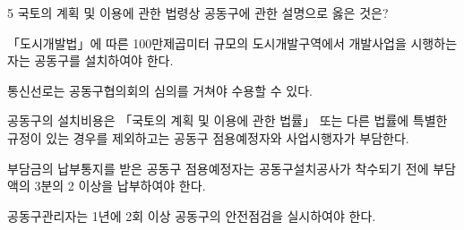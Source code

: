\begin{question}{5}
국토의 계획 및 이용에 관한 법령상 공동구에 관한 설명으로 옳은 것은?
\begin{choices}
  \item 「도시개발법」에 따른 100만제곱미터 규모의 도시개발구역에서 개발사업을 시행하는 자는 공동구를 설치하여야 한다.
  \item 통신선로는 공동구협의회의 심의를 거쳐야 수용할 수 있다.
  \item 공동구의 설치비용은 「국토의 계획 및 이용에 관한 법률」 또는 다른 법률에 특별한 규정이 있는 경우를 제외하고는 공동구 점용예정자와 사업시행자가 부담한다.
  \item 부담금의 납부통지를 받은 공동구 점용예정자는 공동구설치공사가 착수되기 전에 부담액의 3분의 2 이상을 납부하여야 한다.
  \item 공동구관리자는 1년에 2회 이상 공동구의 안전점검을 실시하여야 한다.
\end{choices}
\end{question}
